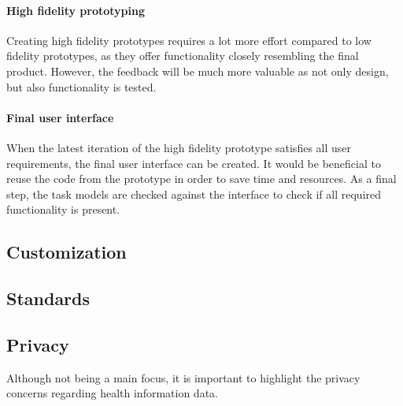         \paragraph{High fidelity prototyping} Creating high fidelity prototypes requires a lot more effort compared to low fidelity prototypes, as they offer functionality closely resembling the final product. However, the feedback will be much more valuable as not only design, but also functionality is tested.

        \paragraph{Final user interface} When the latest iteration of the high fidelity prototype satisfies all user requirements, the final user interface can be created. It would be beneficial to reuse the code from the prototype in order to save time and resources. As a final step, the task models are checked against the interface to check if all required functionality is present.


    \subsection{Customization}

    \subsection{Standards} \label{2_standards}

    \subsection{Privacy}
    Although not being a main focus, it is important to highlight the privacy concerns regarding health information data.

    

        

        


